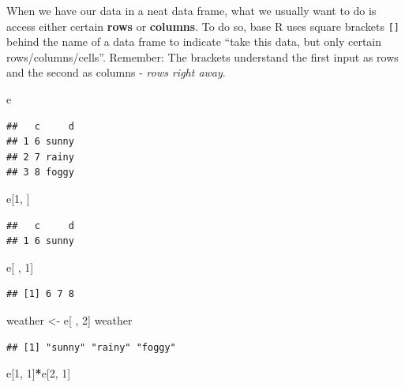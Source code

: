 \documentclass[
]{book}
\newenvironment{Shaded}{\begin{snugshade}}{\end{snugshade}}
\newcommand{\DecValTok}[1]{\textcolor[rgb]{0.00,0.00,0.81}{#1}}
\newcommand{\NormalTok}[1]{#1}
\newcommand{\OtherTok}[1]{\textcolor[rgb]{0.56,0.35,0.01}{#1}}
\newcommand{\SpecialCharTok}[1]{\textcolor[rgb]{0.81,0.36,0.00}{\textbf{#1}}}
\begin{document}
When we have our data in a neat data frame, what we usually want to do is access either certain \textbf{rows} or \textbf{columns}.
To do so, base R uses square brackets \texttt{{[}{]}} behind the name of a data frame to indicate ``take this data, but only certain rows/columns/cells''.
Remember: The brackets understand the first input as rows and the second as columns - \emph{rows right away}.

\begin{Shaded}
\begin{Highlighting}[]
\NormalTok{e }
\end{Highlighting}
\end{Shaded}

\begin{verbatim}
##   c     d
## 1 6 sunny
## 2 7 rainy
## 3 8 foggy
\end{verbatim}

\begin{Shaded}
\begin{Highlighting}[]
\NormalTok{e[}\DecValTok{1}\NormalTok{, ]}
\end{Highlighting}
\end{Shaded}

\begin{verbatim}
##   c     d
## 1 6 sunny
\end{verbatim}

\begin{Shaded}
\begin{Highlighting}[]
\NormalTok{e[ , }\DecValTok{1}\NormalTok{]}
\end{Highlighting}
\end{Shaded}

\begin{verbatim}
## [1] 6 7 8
\end{verbatim}

\begin{Shaded}
\begin{Highlighting}[]
\NormalTok{weather }\OtherTok{\textless{}{-}}\NormalTok{ e[ , }\DecValTok{2}\NormalTok{]}
\NormalTok{weather}
\end{Highlighting}
\end{Shaded}

\begin{verbatim}
## [1] "sunny" "rainy" "foggy"
\end{verbatim}

\begin{Shaded}
\begin{Highlighting}[]
\NormalTok{e[}\DecValTok{1}\NormalTok{, }\DecValTok{1}\NormalTok{]}\SpecialCharTok{*}\NormalTok{e[}\DecValTok{2}\NormalTok{, }\DecValTok{1}\NormalTok{]}
\end{Highlighting}
\end{Shaded}
\end{document}
